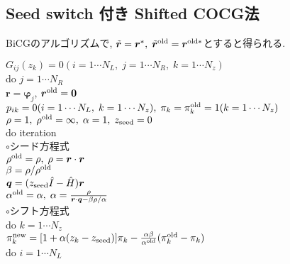 \documentclass[12pt,titlepage]{jarticle}
\begin{document}
\subsection{Seed switch 付き Shifted COCG法}

BiCGのアルゴリズムで, ${\tilde {\boldsymbol r}} = {\boldsymbol r}^*,\; 
{\tilde {\boldsymbol r}}^{\rm old} = {\boldsymbol r}^{{\rm old}*}$とすると得られる.

\noindent
$G_{i j}(z_k) = 0 (i=1 \cdots N_L,\; j = 1 \cdots N_R,\; k=1 \cdots N_z)$
\\
do $j = 1 \cdots N_R$
\\\hspace{0.5cm}
${\boldsymbol r} = {\boldsymbol \varphi_j}$, 
${\boldsymbol r}^{\rm old} = {\bf 0}$
\\\hspace{0.5cm}
$p_{i k} = 0(i=1 \cdots N_L,\; k=1 \cdots N_z),\; \pi_k=\pi_k^{\rm old} = 1(k=1 \cdots N_z)$ 
\\\hspace{0.5cm}
$\rho = 1,\; \rho^{\rm old} = \infty,\; \alpha = 1,\; z_{\rm seed}=0$ 
\\\hspace{0.5cm}
do iteration
\\\hspace{1.0cm}
$\circ$シード方程式
\\\hspace{1.0cm}
$\rho^{\rm old} = \rho,\; \rho = {\boldsymbol r} \cdot {\boldsymbol r}$
\\\hspace{1.0cm}
$\beta = \rho / \rho^{\rm old}$
\\\hspace{1.0cm}
${\boldsymbol q} = (z_{\rm seed} {\hat I} - {\hat H}){\boldsymbol r}$
\\\hspace{1.0cm}
$\alpha^{\rm old} = \alpha,\; 
\alpha = \frac{\rho}{{\boldsymbol r}\cdot{\boldsymbol q} - \beta \rho / \alpha }$
\\\hspace{1.0cm}
$\circ$シフト方程式
\\\hspace{1.0cm}
do $k = 1 \cdots N_z$
\\\hspace{1.5cm}
$\pi_k^{\rm new} = [1+\alpha(z_k-z_{\rm seed})]\pi_k - \frac{\alpha \beta}{\alpha^{\rm old}}(\pi_k^{\rm old} - \pi_k)$
\\\hspace{1.5cm}
do $i = 1 \cdots N_L$
\end{document}
